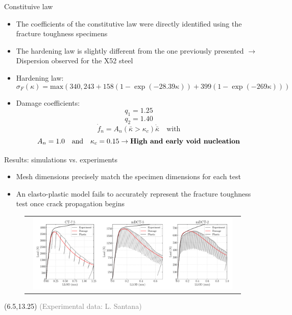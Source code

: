 \documentclass[9pt]{beamer}
\begin{document}
\begin{frame}{Constituive law}

    \begin{itemize}
        \item The coefficients of the constitutive law were directly identified using the fracture toughness specimens
        \vspace{0.2cm}
        \item The hardening law is slightly different from the one previously presented $\rightarrow$ Dispersion observed for the X52 steel
        \vspace{0.2cm}
        \item Hardening law: 
        $$\sigma_F(\kappa) = \textrm{max}(340, 243 + 158 (1-\exp(-28.39 \kappa)) + 399 (1-\exp(-269 \kappa)))$$
        \item Damage coefficients:
        $$ q_1 = 1.25$$ 
        $$ q_2 =  1.40$$
        $$ \dot{f}_n = A_n (\bar{\kappa} > \kappa_c) \dot{\bar{\kappa}} \quad \textrm{with}$$ $$A_n = 1.0 \quad \textrm{and} \quad \kappa_c = 0.15 \rightarrow \textrm{\textbf{High and early void nucleation}}$$
    \end{itemize}

\end{frame}  


\begin{frame}{Results: simulations vs. experiments}

    \begin{itemize}
        \item Mesh dimensions precisely match the specimen dimensions for each test
        \vspace{0.15cm}
        \item An elasto-plastic model fails to accurately represent the fracture toughness test once crack propagation begins
        
    \end{itemize}

\begin{figure}
        \begin{tabular}{c}
            \includegraphics[width=0.95\textwidth]{Images/F_Load_X52.pdf} \\
        \end{tabular}
    \end{figure}
    
    \begin{textblock}{6}(6.5,13.25)
        \textcolor{gray}{\scriptsize (Experimental data: L. Santana)}
    \end{textblock}

\end{frame}  
\end{document}
